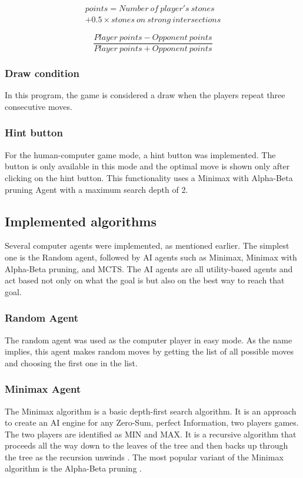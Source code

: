 \documentclass[journal]{IEEEtran}
\begin{document}
\begin{multline}
    \label{eq:player_points}
    points = Number~of~player's~stones \\
     + 0.5 \times stones~on~strong~intersections
\end{multline}

\begin{equation}
    \label{eq:eval_func}
    \frac {Player~points - Opponent~points}{Player~points + Opponent~points}
\end{equation}

\subsubsection{Draw condition}
In this program, the game is considered a draw when the players repeat three consecutive moves.

\subsubsection{Hint button}
For the human-computer game mode, a hint button was implemented. The button is only available in this mode and the optimal move is shown only after clicking on the hint button. This functionality uses a Minimax with Alpha-Beta pruning Agent with a maximum search depth of 2.

\subsection{Implemented algorithms}
Several computer agents were implemented, as mentioned earlier. The simplest one is the Random agent, followed by AI agents such as Minimax, Minimax with Alpha-Beta pruning, and MCTS. The AI agents are all utility-based agents and act based not only on what the goal is but also on the best way to reach that goal.

\subsubsection{\textbf{Random Agent}}
The random agent was used as the computer player in easy mode. As the name implies, this agent makes random moves by getting the list of all possible moves and choosing the first one in the list.

\subsubsection{\textbf{Minimax Agent}}
The Minimax algorithm is a basic depth-first search algorithm. It is an approach to create an AI engine for any Zero-Sum, perfect Information, two players games. The two players are identified as MIN and MAX.  It is a recursive algorithm that proceeds all the way down to the leaves of the tree and then backs up through the tree as the recursion unwinds \cite{russell2020}.  The most popular variant of the Minimax algorithm is the Alpha-Beta pruning \cite{Knuth1975}. 
\end{document}
